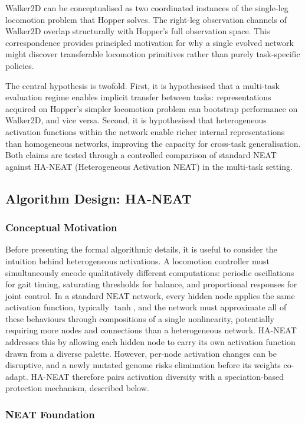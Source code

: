 \documentclass[12pt]{article}
\begin{document}
Walker2D can be conceptualised as two coordinated instances of the single-leg locomotion problem that Hopper solves. The right-leg observation channels of Walker2D overlap structurally with Hopper's full observation space. This correspondence provides principled motivation for why a single evolved network might discover transferable locomotion primitives rather than purely task-specific policies.

The central hypothesis is twofold. First, it is hypothesised that a multi-task evaluation regime enables implicit transfer between tasks: representations acquired on Hopper's simpler locomotion problem can bootstrap performance on Walker2D, and vice versa. Second, it is hypothesised that heterogeneous activation functions within the network enable richer internal representations than homogeneous networks, improving the capacity for cross-task generalisation. Both claims are tested through a controlled comparison of standard NEAT against HA-NEAT (Heterogeneous Activation NEAT) in the multi-task setting.

\subsection{Algorithm Design: HA-NEAT}

\subsubsection{Conceptual Motivation}

Before presenting the formal algorithmic details, it is useful to consider the intuition behind heterogeneous activations. A locomotion controller must simultaneously encode qualitatively different computations: periodic oscillations for gait timing, saturating thresholds for balance, and proportional responses for joint control. In a standard NEAT network, every hidden node applies the same activation function, typically $\tanh$, and the network must approximate all of these behaviours through compositions of a single nonlinearity, potentially requiring more nodes and connections than a heterogeneous network. HA-NEAT addresses this by allowing each hidden node to carry its own activation function drawn from a diverse palette. However, per-node activation changes can be disruptive, and a newly mutated genome risks elimination before its weights co-adapt. HA-NEAT therefore pairs activation diversity with a speciation-based protection mechanism, described below.

\subsubsection{NEAT Foundation}
\end{document}
